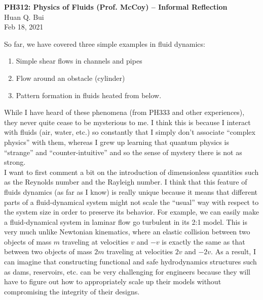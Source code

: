 \documentclass[11pt]{article}
\begin{document}
\begin{center}
{\large \bf PH312: Physics of Fluids (Prof. McCoy) -- Informal Reflection}\\
{ Huan Q. Bui}\\
Feb 18, 2021
\end{center}

\noindent So far, we have covered three simple examples in fluid dynamics:
\begin{enumerate}
	\item Simple shear flows in channels and pipes
	\item Flow around an obstacle (cylinder)
	\item Pattern formation in fluids heated from below.
\end{enumerate}

While I have heard of these phenomena (from PH333 and other experiences), they never quite cease to be mysterious to me. I think this is because I interact with fluids (air, water, etc.) so constantly that I simply don't associate ``complex physics'' with them, whereas I grew up learning that quantum physics is ``strange'' and ``counter-intuitive'' and so the sense of mystery there is not as strong. \\

I want to first comment a bit on the introduction of dimensionless quantities such as the Reynolds number and the Rayleigh number. I think that this feature of fluids dynamics (as far as I know) is really unique because it means that different parts of a fluid-dynamical system might not scale the ``usual'' way with respect to the system size in order to preserve its behavior. For example, we can easily make a fluid-dynamical system in laminar flow go turbulent in its 2:1 model. This is very much unlike Newtonian kinematics, where an elastic collision between two objects of mass $m$ traveling at velocities $v$ and $-v$ is exactly the same as that between two objects of mass $2m$ traveling at velocities $2v$ and $-2v$. As a result, I can imagine that constructing functional and safe hydrodynamics structures such as dams, reservoirs, etc. can be very challenging for engineers because they will have to figure out how to appropriately scale up their models without compromising the integrity of their designs. \\
 
\end{document}
